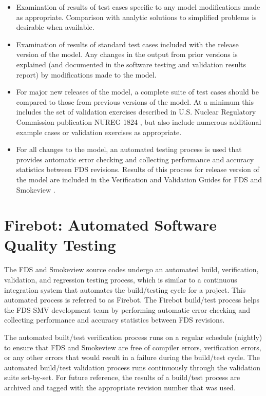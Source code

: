 \documentclass[11pt]{book}
\begin{document}
\begin{itemize}
\item Examination of results of test cases specific to any model modifications made as appropriate.  Comparison with analytic solutions to simplified problems is desirable when available.

\item Examination of results of standard test cases included with the release version of the model. Any changes in the output from prior versions is explained (and documented in the software testing and validation results report) by modifications made to the model.

\item For major new releases of the model, a complete suite of test cases should be compared to those from previous versions of the model.  At a minimum this includes the set of validation exercises described in U.S. Nuclear Regulatory Commission publication NUREG 1824 \cite{NUREG_1824, NUREG_1824_Sup_1}, but also include numerous additional example cases or validation exercises as appropriate.

\item For all changes to the model, an automated testing process is used that provides automatic error checking and collecting performance and accuracy statistics between FDS revisions. Results of this process for release version of the model are included in the Verification and Validation Guides for FDS \cite{FDS_Validation_Guide, FDS_Verification_Guide} and Smokeview \cite{Smokeview_Verification_Guide}.
\end{itemize}


\section{Firebot: Automated Software Quality Testing}

The FDS and Smokeview source codes undergo an automated build, verification, validation, and regression testing process, which is similar to a continuous integration system that automates the build/testing cycle for a project. This automated process is referred to as Firebot. The Firebot build/test process helps the FDS-SMV development team by performing automatic error checking and collecting performance and accuracy statistics between FDS revisions.

The automated built/test verification process runs on a regular schedule (nightly) to ensure that FDS and Smokeview are free of compiler errors, verification errors, or any other errors that would result in a failure during the build/test cycle. The automated build/test validation process runs continuously through the validation suite set-by-set. For future reference, the results of a build/test process are archived and tagged with the appropriate revision number that was used.
\end{document}
